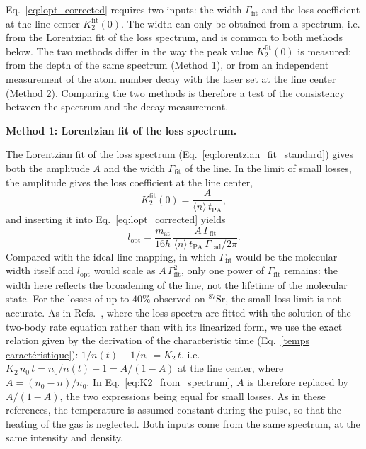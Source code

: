 Eq.~\ref{eq:lopt_corrected} requires two inputs: the width $\Gamma_{\text{fit}}$ and the
loss coefficient at the line center $K_2^{\text{fit}}(0)$. The width can only be obtained
from a spectrum, i.e. from the Lorentzian fit of the loss spectrum, and is common to both
methods below. The two methods differ in the way the peak value $K_2^{\text{fit}}(0)$ is
measured: from the depth of the same spectrum (Method 1), or from an independent
measurement of the atom number decay with the laser set at the line center (Method 2).
Comparing the two methods is therefore a test of the consistency between the spectrum
and the decay measurement.

\textbf{Method 1: Lorentzian fit of the loss spectrum.}

The Lorentzian fit of the loss spectrum (Eq.~\ref{eq:lorentzian_fit_standard}) gives
both the amplitude $A$ and the width $\Gamma_{\text{fit}}$ of the line. In the limit of
small losses, the amplitude gives the loss coefficient at the line center,
\begin{equation}
    K_2^{\text{fit}}(0) = \frac{A}{\langle n\rangle\,t_{\text{PA}}},
    \label{eq:K2_from_spectrum}
\end{equation}
and inserting it into Eq.~\ref{eq:lopt_corrected} yields
\begin{equation}
    l_{\text{opt}} = \frac{m_{\text{at}}}{16h}\,
    \frac{A\,\Gamma_{\text{fit}}}{\langle n\rangle\,t_{\text{PA}}\,\Gamma_{\text{rad}}/2\pi}.
\end{equation}
Compared with the ideal-line mapping, in which $\Gamma_{\text{fit}}$ would be the
molecular width itself and $l_{\text{opt}}$ would scale as $A\,\Gamma_{\text{fit}}^2$,
only one power of $\Gamma_{\text{fit}}$ remains: the width here reflects the
broadening of the line, not the lifetime of the molecular state. For the
losses of up to $40\%$ observed on $^{87}\text{Sr}$, the small-loss limit is not accurate. As
in Refs.~\cite{zelevinsky_narrow_2006,blatt_systematic_2011}, where the loss spectra
are fitted with the solution of the two-body rate equation rather than with its
linearized form, we use the exact relation given by the derivation of the
characteristic time (Eq.~\ref{temps caractéristique}): $1/n(t)-1/n_0=K_2\,t$, i.e.
$K_2\,n_0\,t=n_0/n(t)-1=A/(1-A)$ at the line center, where $A=(n_0-n)/n_0$. In
Eq.~\ref{eq:K2_from_spectrum}, $A$ is therefore replaced by $A/(1-A)$, the two
expressions being equal for small losses. As in these references, the temperature is
assumed constant during the pulse, so that the heating of the gas is neglected. Both
inputs come from the same spectrum, at the same intensity and density.

